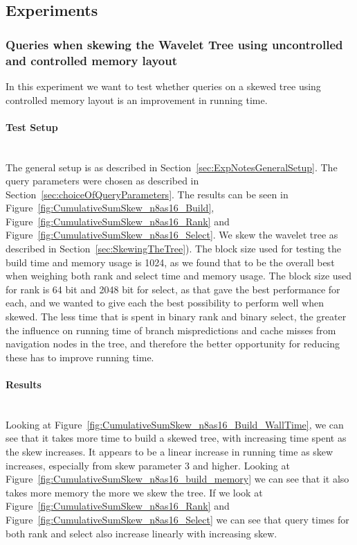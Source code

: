 \subsection{Experiments}

\subsubsection{Queries when skewing the Wavelet Tree using uncontrolled and controlled memory layout}
In this experiment we want to test whether queries on a skewed tree using controlled memory layout is an improvement in running time.

\paragraph{Test Setup}~\\
The general setup is as described in Section~\ref{sec:ExpNotesGeneralSetup}.
The query parameters were chosen as described in Section~\ref{sec:choiceOfQueryParameters}.
The results can be seen in Figure~\ref{fig:CumulativeSumSkew_n8as16_Build}, Figure~\ref{fig:CumulativeSumSkew_n8as16_Rank} and Figure~\ref{fig:CumulativeSumSkew_n8as16_Select}.
We skew the wavelet tree as described in Section~\ref{sec:SkewingTheTree}).
The block size used for testing the build time and memory usage is 1024, as we found that to be the overall best when weighing both rank and select time and memory usage.
The block size used for rank is 64 bit and 2048 bit for select, as that gave the best performance for each, and we wanted to give each the best possibility to perform well when skewed.
The less time that is spent in binary rank and binary select, the greater the influence on running time of branch mispredictions and cache misses from navigation nodes in the tree, and therefore the better opportunity for reducing these has to improve running time.

\paragraph{Results}~\\
Looking at Figure~\ref{fig:CumulativeSumSkew_n8as16_Build_WallTime}, we can see that it takes more time to build a skewed tree, with increasing time spent as the skew increases.
It appears to be a linear increase in running time as skew increases, especially from skew parameter 3 and higher.
Looking at Figure~\ref{fig:CumulativeSumSkew_n8as16_build_memory} we can see that it also takes more memory the more we skew the tree.
If we look at Figure~\ref{fig:CumulativeSumSkew_n8as16_Rank} and Figure~\ref{fig:CumulativeSumSkew_n8as16_Select} we can see that query times for both rank and select also increase linearly with increasing skew.

